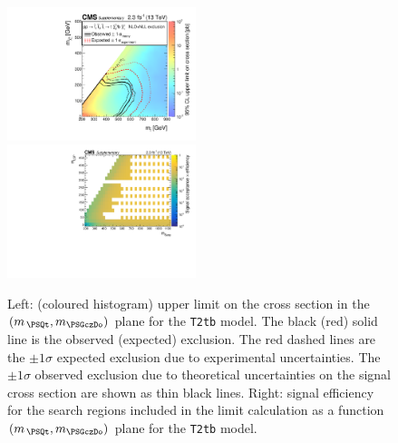 \begin{figure}[t]
  \begin{center}
    \includegraphics[width=0.49\textwidth]{RA1T2tbXSEC_aux} \, 
    \includegraphics[width=0.49\textwidth]{T2tb_merging_4_cats_aux} \,     
  \end{center}
  \caption{Left: (coloured histogram) upper limit on the cross section in the $(m_{\,\PSQt}, m_{\PSGczDo})$ plane for the \texttt{T2tb} model. 
  The black (red) solid line is the observed (expected) exclusion. The red dashed lines are the $\pm1\sigma$ expected exclusion due to experimental uncertainties. 
  The $\pm1\sigma$ observed exclusion due to theoretical uncertainties on the signal cross section are shown as thin black lines. 
  Right: signal efficiency for the search regions included in the limit calculation as a function $(m_{\,\PSQt}, m_{\PSGczDo})$ plane for the \texttt{T2tb} model. 
  \label{fig:T2tb_excl}}
\end{figure}


